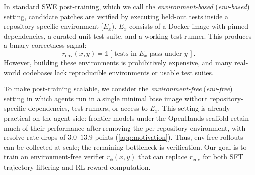 \documentclass{llmxive}
\providecommand{\approach}{Dockerless\xspace}
\begin{document}
In standard SWE post-training, which we call the \emph{environment-based} (\emph{env-based}) setting, candidate patches are verified by executing held-out tests inside a repository-specific environment ($E_x$). $E_x$ consists of a Docker image with pinned dependencies, a curated unit-test suite, and a working test runner.
This produces a binary correctness signal:
\begin{equation}
  r_{\text{env}}(x, y) = \mathbb{1}\!\left[\,\text{tests in } E_x \text{ pass under } y\,\right].
  \label{eq:env-reward}
\end{equation}
However, building these environments is prohibitively expensive, and many real-world codebases lack reproducible environments or usable test suites.


To make post-training scalable, we consider the \emph{environment-free} (\emph{env-free}) setting in which agents run in a single minimal base image without repository-specific dependencies, test runners, or access to \(E_x\).
This setting is already practical on the agent side: frontier models under the OpenHands scaffold retain much of their performance after removing the per-repository environment, with resolve-rate drops of $3.0$--$13.9$ points (\cref{app:motivation}).
Thus, env-free rollouts can be collected at scale; the remaining bottleneck is verification.
Our goal is to train an environment-free verifier \(r_\phi(x,y)\) that can replace \(r_{\text{env}}\) for both SFT trajectory filtering and RL reward computation.
\end{document}
